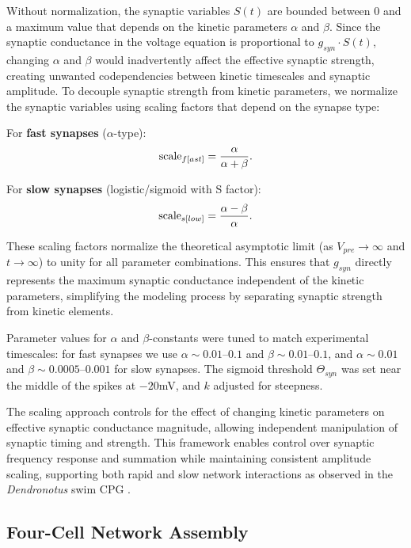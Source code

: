 \documentclass[nofootinbib,aip,amsmath,amssymb,preprint,twocolumn,floatfix,10pt]{revtex4-2}
\begin{document}
Without normalization, the synaptic variables $S(t)$ are bounded between 0 and a maximum value that depends on the kinetic parameters $\alpha$ and $\beta$. Since the synaptic conductance in the voltage equation is proportional to $g_{syn} \cdot S(t)$, changing $\alpha$ and $\beta$ would inadvertently affect the effective synaptic strength, creating unwanted codependencies between kinetic timescales and synaptic amplitude. To decouple synaptic strength from kinetic parameters, we normalize the synaptic variables using scaling factors that depend on the synapse type:

For \textbf{fast synapses} ($\alpha$-type):
\begin{equation}
  {\rm scale}_{f[ast]} = \frac{\alpha}{\alpha + \beta}.
\end{equation}

For \textbf{slow synapses} (logistic/sigmoid with S factor):
\begin{equation}
  {\rm scale}_{s[low]} = \frac{\alpha - \beta}{\alpha}.
\end{equation}

These scaling factors normalize the theoretical asymptotic limit (as $V_{pre} \to \infty$ and $t \to \infty$) to unity for all parameter combinations. This ensures that $g_{syn}$ directly represents the maximum synaptic conductance independent of the kinetic parameters, simplifying the modeling process by separating synaptic strength from kinetic elements.

Parameter values for $\alpha$ and $\beta$-constants were tuned to match experimental timescales: for fast synapses we use $\alpha \sim 0.01$--$0.1$ and $\beta \sim 0.01$--$0.1$, and $\alpha \sim 0.01$ and $\beta \sim 0.0005$--$0.001$ for  slow synapses. The sigmoid threshold $\Theta_{syn}$ was set near the middle of the spikes at $-20$mV, and $k$ adjusted for steepness.

The scaling approach controls for the effect of changing kinetic parameters on effective synaptic conductance magnitude, allowing independent manipulation of synaptic timing and strength. This framework enables control over synaptic frequency response and summation while maintaining consistent amplitude scaling, supporting both rapid and slow network interactions as observed in the \textit{Dendronotus} swim CPG \cite{SakuraiKatz2016}.

\subsection{Four-Cell Network Assembly}
\end{document}
